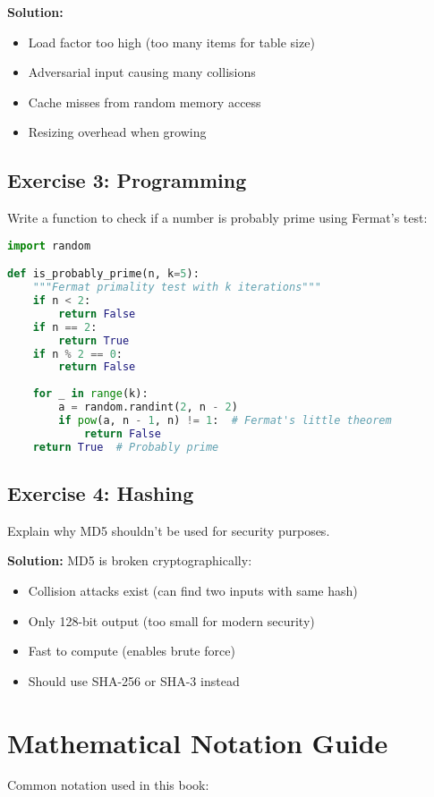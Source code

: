 \textbf{Solution:}
\begin{itemize}
\item Load factor too high (too many items for table size)
\item Adversarial input causing many collisions
\item Cache misses from random memory access
\item Resizing overhead when growing
\end{itemize}

\subsection{Exercise 3: Programming}
Write a function to check if a number is probably prime using Fermat's test:

\begin{lstlisting}[language=Python]
import random

def is_probably_prime(n, k=5):
    """Fermat primality test with k iterations"""
    if n < 2:
        return False
    if n == 2:
        return True
    if n % 2 == 0:
        return False
    
    for _ in range(k):
        a = random.randint(2, n - 2)
        if pow(a, n - 1, n) != 1:  # Fermat's little theorem
            return False
    return True  # Probably prime
\end{lstlisting}

\subsection{Exercise 4: Hashing}
Explain why MD5 shouldn't be used for security purposes.

\textbf{Solution:}
MD5 is broken cryptographically:
\begin{itemize}
\item Collision attacks exist (can find two inputs with same hash)
\item Only 128-bit output (too small for modern security)
\item Fast to compute (enables brute force)
\item Should use SHA-256 or SHA-3 instead
\end{itemize}

\section{Mathematical Notation Guide}

Common notation used in this book:

